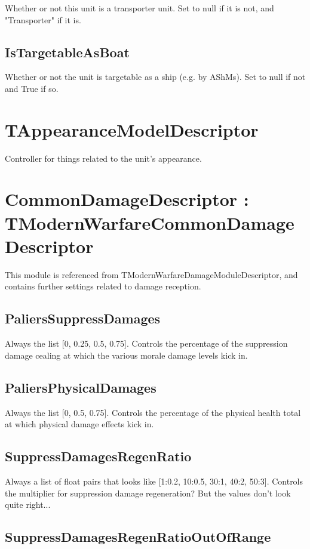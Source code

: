 \documentclass{article}
\begin{document}
Whether or not this unit is a transporter unit. Set to null if it is not, and "Transporter" if it is.

\subsection{IsTargetableAsBoat}

Whether or not the unit is targetable as a ship (e.g. by AShMs). Set to null if not and True if so.

\section{TAppearanceModelDescriptor}

Controller for things related to the unit's appearance.

\section{CommonDamageDescriptor : TModernWarfareCommonDamageDescriptor}

This module is referenced from TModernWarfareDamageModuleDescriptor, and contains further settings related to damage reception.

\subsection{PaliersSuppressDamages}

Always the list [0, 0.25, 0.5, 0.75]. Controls the percentage of the suppression damage cealing at which the various morale damage levels kick in.

\subsection{PaliersPhysicalDamages}

Always the list [0, 0.5, 0.75]. Controls the percentage of the physical health total at which physical damage effects kick in.

\subsection{SuppressDamagesRegenRatio}

Always a list of float pairs that looks like [1:0.2, 10:0.5, 30:1, 40:2, 50:3]. Controls the multiplier for suppression damage regeneration? But the values don't look quite right...

\subsection{SuppressDamagesRegenRatioOutOfRange}
\end{document}
